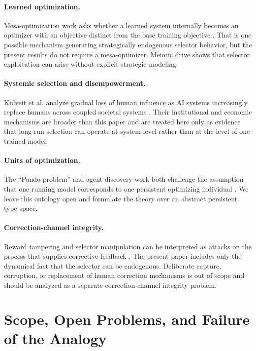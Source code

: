 \documentclass[11pt]{article}
\begin{document}
\paragraph{Learned optimization.}
Mesa-optimization work asks whether a learned system internally becomes an optimizer with an objective distinct from the base training objective \parencite{hubinger2019}. That is one possible mechanism generating strategically endogenous selector behavior, but the present results do not require a mesa-optimizer. Meiotic drive shows that selector exploitation can arise without explicit strategic modeling.

\paragraph{Systemic selection and disempowerment.}
Kulveit et al. analyze gradual loss of human influence as AI systems increasingly replace humans across coupled societal systems \parencite{kulveit2025gradual}. Their institutional and economic mechanisms are broader than this paper and are treated here only as evidence that long-run selection can operate at system level rather than at the level of one trained model.

\paragraph{Units of optimization.}
The ``Pando problem'' and agent-discovery work both challenge the assumption that one running model corresponds to one persistent optimizing individual \parencite{kulveit2025pando,zarncke2025uad}. We leave this ontology open and formulate the theory over an abstract persistent type space.

\paragraph{Correction-channel integrity.}
Reward tampering and selector manipulation can be interpreted as attacks on the process that supplies corrective feedback \parencite{everitt2019}. The present paper includes only the dynamical fact that the selector can be endogenous. Deliberate capture, corruption, or replacement of human correction mechanisms is out of scope and should be analyzed as a separate correction-channel integrity problem.

\section{Scope, Open Problems, and Failure of the Analogy}
\end{document}
